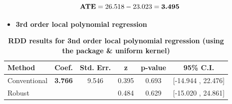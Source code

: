 \documentclass[a4paper]{article}
\begin{document}
\vspace{5cm}

\begin{equation}
\text{\textbf{ATE}} = 26.518 - 23.023 = \textbf{3.495}
\end{equation}



\begin{itemize}
	\item  \textbf{3rd order local polynomial regression }
\end{itemize}

\begin{table}[ht!]
	\caption{\textbf{RDD results for 3nd order local polynomial regression (using the package \& uniform kernel)}} 
	\begin{center}
		\begin{threeparttable}
			\begin{tabular}{lccccc}
				\hline
				Method & Coef. & Std. Err. & z & p-value & 95\% C.I. \\
				\hline
				Conventional   &  \textbf{3.766}   &  9.546   &  0.395  &   0.693   & [-14.944 , 22.476]    \\
				Robust         &         & &     0.484  &   0.629 &  [-15.020 , 24.861]    \\
				\hline
			\end{tabular}
		\end{threeparttable}
	\end{center}
\end{table}

\vspace{6cm}
\end{document}
